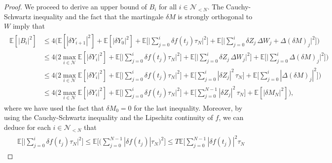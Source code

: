\documentclass[11pt]{article}
\numberwithin{equation}{section}
\theoremstyle{definition}
\theoremstyle{remark}
\def \la{\langle} \def\ra{\rangle}
\def\cN{\mathcal{N}}
\def\sE{{\mathbb{E}}}
\begin{document}
\begin{proof}
We proceed to derive an upper bound of $B_i$ for all $i\in \cN_{<N}$.
The Cauchy-Schwartz inequality
and  
the fact that 
the martingale $\delta M$ is strongly orthogonal to  $W$
imply that
\begin{align*}
\begin{split}
\sE[|B_i|^2]
&\le
4\bigg(
\sE[|\delta Y_{i+1}|^2]
+\sE[|\delta Y_{0}|^2]
+\sE\bigg[ \bigg|
\sum_{j=0}^i
\delta f(t_{j})\tau_N
\bigg|^2\bigg]  
+\sE\bigg[ \bigg|
\sum_{j=0}^i
\delta{Z}_j\,\Delta W_j+\Delta (\delta {M})_j
\bigg|^2\bigg]  
\bigg)
\\
&\le
4\bigg(
2\max_{i\in \cN}\sE[|\delta Y_{i}|^2]
+\sE\bigg[ \bigg|
\sum_{j=0}^i
\delta f(t_{j})\tau_N
\bigg|^2\bigg]  
+
\sE\bigg[ \bigg|
\sum_{j=0}^i
\delta{Z}_j\,\Delta W_j\bigg|^2\bigg]
+\sE\bigg[ \bigg|
\sum_{j=0}^i\Delta (\delta {M})_j
\bigg|^2\bigg]  
\bigg)
\\
&\le 
4\bigg(
2\max_{i\in \cN}\sE[|\delta Y_{i}|^2]
+\sE\bigg[ \bigg|
\sum_{j=0}^i
\delta f(t_{j})\tau_N
\bigg|^2\bigg]  
 +\sE\bigg[ 
\sum_{j=0}^i
|\delta{Z}_j|^2\,\tau_N\bigg]
+\sE\bigg[ 
\sum_{j=0}^i|\Delta (\delta {M})_j|^2
\bigg]
\bigg)
\\
&\le
4\bigg(
2\max_{i\in \cN}\sE[|\delta Y_{i}|^2]
+\sE\bigg[ \bigg|
\sum_{j=0}^i
\delta f(t_{j})\tau_N
\bigg|^2\bigg]  
 +\sE\bigg[ 
\sum_{j=0}^{N-1}
|\delta{Z}_j|^2\,\tau_N\bigg]
+\sE[| \delta {M}_N|^2]
\bigg),
\end{split}
\end{align*}
where we have used
 the fact that  $\delta M_0=0$
for the last inequality.
Moreover, 
by  using the Cauchy-Schwartz inequality
and the Lipschitz continuity of $f$,
we can deduce for each $i\in \cN_{<N}$  that
\begin{align*}
\begin{split}
&\sE\bigg[ \bigg|
\sum_{j=0}^i
\delta f(t_{j})\tau_N
\bigg|^2\bigg]  
\le
\sE\bigg[ \bigg(
\sum_{j=0}^{N-1}
|\delta f(t_{j})|\tau_N
\bigg)^2\bigg]  
\le 
T\sE\bigg[ 
\sum_{j=0}^{N-1}
|\delta f(t_{j})|^2\tau_N

\end{split}
\end{align*}
\end{proof}
\end{document}
